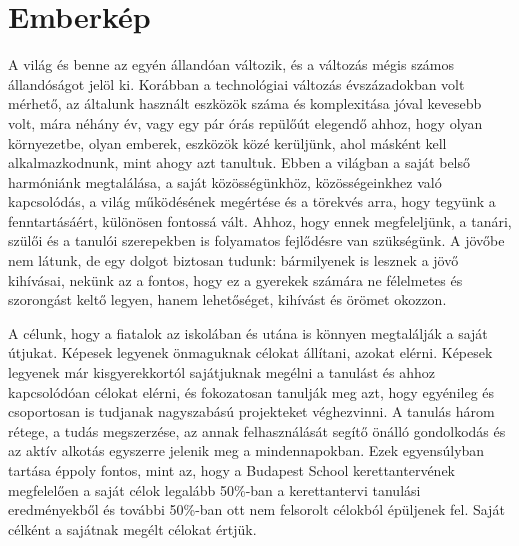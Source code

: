 \section{Emberkép}
\label{sec:gyerekkep}

\begin{spacing}{0.99}
A világ és benne az egyén állandóan változik, és a változás mégis számos állandóságot jelöl ki. Korábban a technológiai változás évszázadokban volt mérhető, az általunk használt eszközök száma és komplexitása jóval kevesebb volt, mára néhány év, vagy egy pár órás repülőút elegendő ahhoz, hogy olyan környezetbe, olyan emberek, eszközök közé kerüljünk, ahol másként kell alkalmazkodnunk, mint ahogy azt tanultuk. Ebben a világban a saját belső harmóniánk megtalálása, a saját közösségünkhöz, közösségeinkhez való kapcsolódás, a világ működésének megértése és a törekvés arra, hogy tegyünk a fenntartásáért, különösen fontossá vált. Ahhoz, hogy ennek megfeleljünk, a tanári, szülői és a tanulói szerepekben is folyamatos fejlődésre van szükségünk. A jövőbe nem látunk, de egy dolgot biztosan tudunk: bármilyenek is lesznek a jövő kihívásai, nekünk az a fontos, hogy ez a gyerekek számára ne félelmetes és szorongást keltő legyen, hanem lehetőséget, kihívást és örömet okozzon.

A célunk, hogy a fiatalok az iskolában és utána is könnyen megtalálják a saját útjukat. Képesek legyenek önmaguknak célokat állítani, azokat elérni. Képesek legyenek már kisgyerekkortól sajátjuknak megélni a tanulást és ahhoz kapcsolódóan célokat elérni, és fokozatosan tanulják meg azt, hogy egyénileg és csoportosan is tudjanak nagyszabású projekteket véghezvinni. A tanulás három rétege, a tudás megszerzése, az annak felhasználását segítő önálló gondolkodás és az aktív alkotás egyszerre jelenik meg a mindennapokban. Ezek egyensúlyban tartása éppoly fontos, mint az, hogy a Budapest School kerettantervének megfelelően a saját célok legalább 50\%-ban a kerettantervi tanulási eredményekből és további 50\%-ban ott nem felsorolt célokból épüljenek fel. Saját célként a sajátnak megélt célokat értjük.


\end{spacing}
